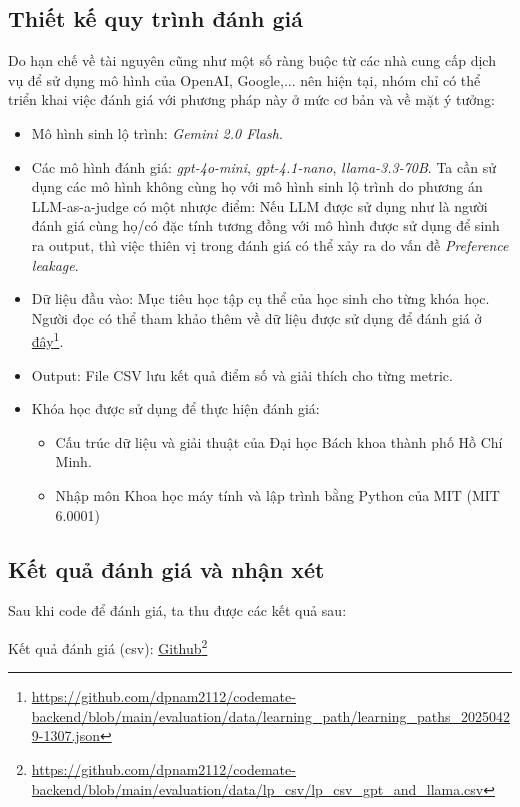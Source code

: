 \subsection{Thiết kế quy trình đánh giá}
Do hạn chế về tài nguyên cũng như một số ràng buộc từ các nhà cung cấp dịch vụ để sử dụng mô hình của OpenAI, Google,... nên hiện tại, nhóm chỉ có thể triển khai việc đánh giá với phương pháp này ở mức cơ bản và về mặt ý tưởng:
\begin{itemize}
    \item Mô hình sinh lộ trình: \emph{Gemini 2.0 Flash}.
    \item Các mô hình đánh giá: \emph{gpt-4o-mini}, \emph{gpt-4.1-nano}, \emph{llama-3.3-70B}. Ta cần sử dụng các mô hình không cùng họ với mô hình sinh lộ trình do phương án LLM-as-a-judge có một nhược điểm: Nếu LLM được sử dụng như là người đánh giá cùng họ/có đặc tính tương đồng với mô hình được sử dụng để sinh ra output, thì việc thiên vị trong đánh giá có thể xảy ra do vấn đề \emph{Preference leakage}.
    \item Dữ liệu đầu vào: Mục tiêu học tập cụ thể của học sinh cho từng khóa học. Người đọc có thể tham khảo thêm về dữ liệu được sử dụng để đánh giá ở \href{https://github.com/dpnam2112/codemate-backend/blob/main/evaluation/data/learning_path/learning_paths_20250429-1307.json}{đây}\footnote{\url{https://github.com/dpnam2112/codemate-backend/blob/main/evaluation/data/learning_path/learning_paths_20250429-1307.json}}.
    \item Output: File CSV lưu kết quả điểm số và giải thích cho từng metric.
    \item Khóa học được sử dụng để thực hiện đánh giá:
    \begin{itemize}
        \item Cấu trúc dữ liệu và giải thuật của Đại học Bách khoa thành phố Hồ Chí Minh.
        \item Nhập môn Khoa học máy tính và lập trình bằng Python của MIT (MIT 6.0001)
    \end{itemize}
\end{itemize}

\subsection{Kết quả đánh giá và nhận xét}

Sau khi code để đánh giá, ta thu được các kết quả sau:

Kết quả đánh giá (csv): \href{https://github.com/dpnam2112/codemate-backend/blob/main/evaluation/data/lp_csv/lp_csv_gpt_and_llama.csv}{Github}\footnote{\url{https://github.com/dpnam2112/codemate-backend/blob/main/evaluation/data/lp_csv/lp_csv_gpt_and_llama.csv}}

